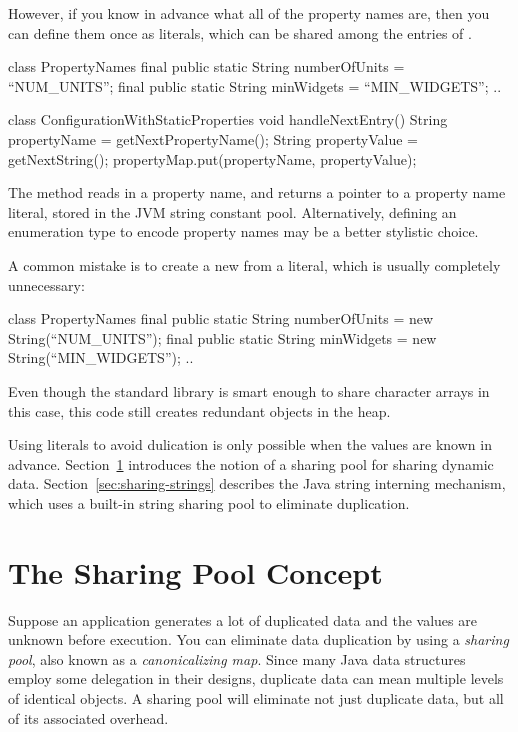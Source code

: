 However, if you know in advance what all of the property names are, then you can
define them once as  literals, which can be shared among the
entries of .
\begin{shortlisting}
class PropertyNames {
	final public static String numberOfUnits = ``NUM_UNITS'';
	final public static String minWidgets = ``MIN_WIDGETS'';
	..
}

class ConfigurationWithStaticProperties {
    void handleNextEntry() {
       String propertyName = getNextPropertyName(); 
       String propertyValue = getNextString();
       propertyMap.put(propertyName, propertyValue);
    }
}
\end{shortlisting}
The  method reads in a property name, and returns
a pointer to a property name literal, stored in the JVM string
constant pool. Alternatively, defining an enumeration
type to encode property names may be a better stylistic choice.

A common
 mistake is to create a new   from a  literal,
 which is usually completely unnecessary:
\begin{shortlisting}
class PropertyNames {
	final public static String numberOfUnits = 
	                           new String(``NUM_UNITS'');
	final public static String minWidgets = 
	                           new String(``MIN_WIDGETS'');
	..
}
\end{shortlisting}
Even though the standard library is smart enough to share
character arrays in this case, this code still creates redundant 
objects in the heap.

Using  literals to avoid dulication is only possible when the
 values are known in advance. 
Section~\ref{sec:sharing-pools} introduces the notion of a sharing pool for
sharing dynamic data. Section~\ref{sec:sharing-strings} describes the Java
string interning mechanism, which uses a built-in string sharing pool to
eliminate duplication.

\section{The Sharing Pool Concept}
\label{sec:sharing-pools}

Suppose an application generates a lot of duplicated data and the values
are unknown before execution. 
You can eliminate data duplication by using a \emph{sharing pool}, also known
as a \emph{canonicalizing map}. Since many Java data structures employ 
some delegation in their designs, duplicate data can mean
multiple levels of identical objects.
A sharing pool will eliminate not just duplicate data, 
but all of its associated overhead.

